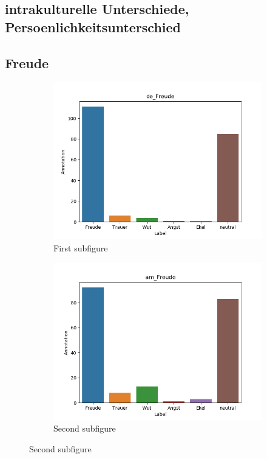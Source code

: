 \documentclass[11pt,a4paper,headsepline,twoside,toc=bibliography]{scrreprt}
\begin{document}
\subsection{intrakulturelle Unterschiede, Persoenlichkeitsunterschied}

\subsection{Freude}


\begin{figure}[t!] %
	\begin{subfigure}{0.48\textwidth}
		\includegraphics[width=\linewidth]{plots/de_Freude.png}
		\caption{First subfigure} \label{fig:de_F}
	\end{subfigure}\hspace*{\fill}
	\begin{subfigure}{0.48\textwidth}
		\includegraphics[width=\linewidth]{plots/am_Freude.png}
		\caption{Second subfigure} \label{fig:am_F}
	\end{subfigure}
	

\end{figure}
\end{document}
